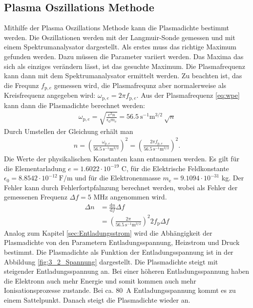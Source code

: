 \subsection{Plasma Oszillations Methode}
Mithilfe der Plasma  Oszillations Methode kann die Plasmadichte bestimmt werden. Die Oszillationen werden mit der Langmuir-Sonde gemessen und mit einem Spektrumanalysator dargestellt. Als erstes muss das richtige Maximum gefunden werden. Dazu müssen die Parameter variiert werden. Das Maxima das sich als einziges verändern lässt, ist das gesuchte Maximum. Die Plasmafrequenz kann dann mit dem Spektrumanalysator ermittelt werden. Zu beachten ist, das die Frequnz $f_{\mathrm{p},e}$ gemessen wird, die Plasmafrequnz aber normalerweise als Kreisfrequenz angegeben wird: $\omega_{\mathrm{p},e}= 2 \pi f_{\mathrm{p},e}$.  Aus der Plasmafrequenz \eqref{eq:wpe} kann dann die Plasmadichte berechnet werden:
\begin{align}
  \omega_{\mathrm{p},e}=\sqrt{\frac{e^2 n}{\epsilon_0 m_{\mathrm{e}}}} = 56.5\ \mathrm{s}^{-1}\mathrm{m}^{3/2}\ \sqrt{n}
\end{align}
Durch Umstellen der Gleichung erhält man
\begin{align}
  n=\left( \frac{\omega_{\mathrm{p},e}}{56.5\ \mathrm{s}^{-1}\mathrm{m}^{3/2}} \right)^2=\left( \frac{2 \pi f_{\mathrm{p},e}}{56.5\ \mathrm{s}^{-1}\mathrm{m}^{3/2}} \right)^2.
\end{align}
Die Werte der physikalischen Konstanten kann \cite{wiki:Konstanten} entnommen werden. Es gilt für die Elementarladung $e= 1.6022 \cdot 10^{-19}$ C, für die Elektrische Feldkonstante $\epsilon_0= 8.8542 \cdot 10^{-12}\ \mathrm{F}/\mathrm{m}$ und für die Elektronenmasse $m_{\mathrm{e}}=9.1094 \cdot 10^{-31}$ kg.
Der Fehler kann durch Fehlerfortpfalnzung berechnet werden, wobei als Fehler der gemessenen Frequenz  $\Delta f= 5$ MHz angenommen wird.  
\begin{align}
  \Delta n &= \frac{\mathrm{d} n}{\mathrm{d} f} \Delta f \\
  &=\left( \frac{2 \pi}{56.5\ \mathrm{s}^{-1}\mathrm{m}^{3/2}} \right)^2 2 f_{\mathrm{p}} \Delta f
\end{align}
Analog zum Kapitel \ref{sec:Entladungsstrom} wird die Abhängigkeit der Plasmadichte von den Parametern Entladungsspannung, Heizstrom und Druck bestimmt. Die Plasmadichte als Funktion der Entladungsspannung ist in der Abbildung \ref{fig:3_2_Spannung} dargestellt. Die Plasmadichte steigt mit steigender Entladungsspannung an. Bei einer höheren Entladungsspannung haben die Elektronn auch mehr Energie  und somit kommen auch mehr Ionisationsprozesse zustande. Bei ca. \SI{80}{A} Entladungsspannung kommt es zu einem Sattelpunkt. Danach steigt die Plasmadichte wieder an. 

